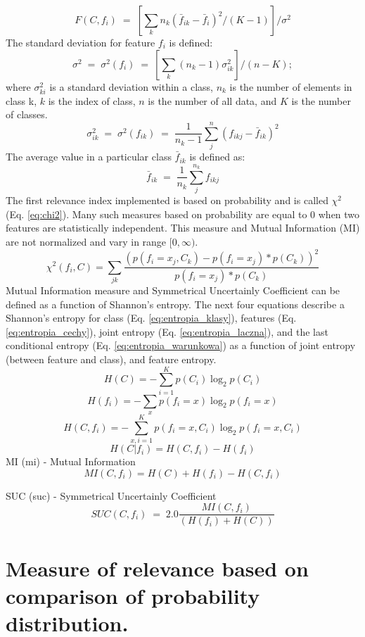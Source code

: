 \documentclass[a4paper,fleqn]{report}
\newcommand\be{\vspace*{1pt}\begin{equation}}
\newcommand\ee{\end{equation}\vspace*{1pt}}
\begin{document}
\be \label{eq:Fstatistic}
F(C,f_i)\;=\;\left[ \sum_{k} n_k \left( \bar{f}_{ik} - \bar{f}_i \right)^{2}/ \left( K - 1 \right) \right] \Biggl/ \sigma^2
\ee
The standard deviation for feature $f_i$ is defined:
\be
\sigma^2\;=\;\sigma^{2}(f_i) \;=\ \left[\sum_{k} \left(n_k - 1 \right) \sigma_{ik}^{2}\right] \biggl/ \left( n - K \right);
\ee
where $\sigma^{2}_{ki}$ is a standard deviation within a class, $n_k$ is the number of elements in class k, $k$ is the index of class, 
$n$ is the number of all data, and $K$ is the number of classes.
\be
\sigma^{2}_{ik} \;=\; \sigma^{2}(f_{ik}) \;=\; \frac{1}{n_k-1} \sum_{j}^{n} \left( f_{ikj} - \bar{f}_{ik} \right)^{2}
\ee
The average value in a particular class $\bar{f}_{ik}$ is defined as:
\be
\bar{f}_{ik}\;=\;\frac{1}{n_k} \sum_{j}^{n_k} f_{ikj}
\ee
The first relevance index implemented is based on probability and is called $\chi^{2}$ (Eq. \ref{eq:chi2}). 
Many such measures based on probability are equal to 0 when two features are statistically independent. 
This measure and Mutual Information (MI) are not normalized and vary in range $[0,\infty)$.
\be \label{eq:chi2}
\chi^{2}(f_i,C) = \sum_{jk}
\frac{\left(p(f_i=x_j,C_k)-p(f_i=x_j)*p(C_k) \right)^{2}} { p(f_i=x_j)*p(C_k) }
\ee
Mutual Information measure and Symmetrical Uncertainly Coefficient \cite{Press1988,Duch2004} 
can be defined as a function of Shannon's entropy. The next four equations
describe a Shannon's entropy for class (Eq. \ref{eq:entropia_klasy}), features (Eq. \ref{eq:entropia_cechy}), 
joint entropy (Eq. \ref{eq:entropia_laczna}), and the last conditional entropy (Eq. \ref{eq:entropia_warunkowa}) as a function of joint entropy (between feature and class), and feature entropy.
\be \label{eq:entropia_klasy}
H(C) =  - \sum_{i=1}^K  p(C_i) \log_2 p(C_i)
\ee
\be \label{eq:entropia_cechy}
H(f_i) =  - \sum_x p(f_i=x) \log_{2}  p(f_i=x)
\ee
\be \label{eq:entropia_laczna}
H(C,f_i) =  - \sum_{x,i=1}^{K} p(f_i=x,C_i) \log_2 p(f_i=x,C_i)
\ee
\be \label{eq:entropia_warunkowa}
H(C|f_i)=H(C,f_i)-H(f_i)
\ee
MI (mi)  - Mutual Information \cite{Vilmansen1973,Duch2004}
\be \label{eq:mutual_information}
MI(C,f_i) =  H(C) + H(f_i)  - H(C,f_i)
\ee

SUC (suc)  - Symmetrical Uncertainly Coefficient \cite{Press1988,Duch2004}
\be
SUC(C,f_i) \;=\;2.0 \frac{MI(C,f_i)}{\left( H(f_i)+H(C) \right)}
\ee

\section{Measure of relevance based on comparison of probability distribution.}
\end{document}
